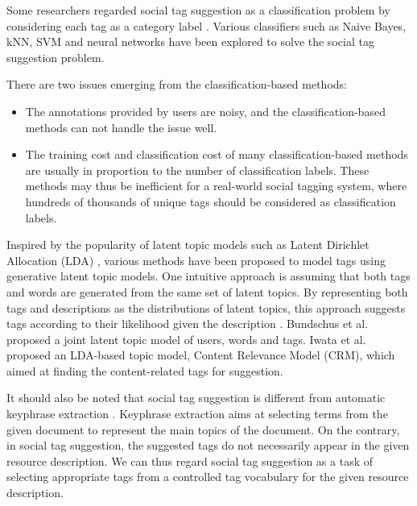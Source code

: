 \documentclass[11pt]{article} %
\begin{document}
Some researchers regarded social tag suggestion as a classification problem by considering each tag as a category label \cite{ohkura2006browsing, mishne2006autotag, lee2007automatic, katakis2008multilabel, fujimura2007blogosonomy, heymann2008social}. Various classifiers such as Naive Bayes, kNN, SVM and neural networks have been explored to solve the social tag suggestion problem.

There are two issues emerging from the classification-based methods:

\begin{itemize}

\item The annotations provided by users are noisy, and the classification-based methods can not handle the issue well.

\item The training cost and classification cost of many classification-based methods are usually in proportion to the number of classification labels. These methods may thus be inefficient for a real-world social tagging system, where hundreds of thousands of unique tags should be considered as classification labels.

\end{itemize}

Inspired by the popularity of latent topic models such as Latent Dirichlet Allocation (LDA) \cite{blei2003modeling}, various methods have been proposed to model tags using generative latent topic models. One intuitive approach is assuming that both tags and words are generated from the same set of latent topics. By representing both tags and descriptions as the distributions of latent topics, this approach suggests tags according to their likelihood given the description \cite{krestel2009latent, liu2009clustering}. Bundschus et al. \cite{bundschus2009hierarchical} proposed a joint latent topic model of users, words and tags. Iwata et al. \cite{iwata2009modeling} proposed an LDA-based topic model, Content Relevance Model (CRM), which aimed at finding the content-related tags for suggestion.

It should also be noted that social tag suggestion is different from automatic keyphrase extraction \cite{liu2011automatic}. Keyphrase extraction aims at selecting terms from the given document to represent the main topics of the document. On the contrary, in social tag suggestion, the suggested tags do not necessarily appear in the given resource description. We can thus regard social tag suggestion as a task of selecting appropriate tags from a controlled tag vocabulary for the given resource description.
\end{document}

